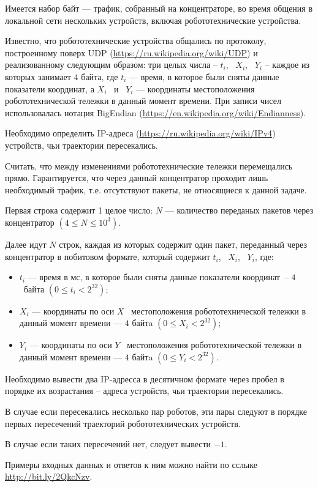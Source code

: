 
Имеется набор байт --- трафик, собранный на концентраторе, во время общения в локальной сети нескольких  устройств,
включая робототехнические устройства.

Известно, что робототехнические устройства общались по протоколу, построенному поверх UDP (\url{https://ru.wikipedia.org/wiki/UDP}) и
реализованному следующим образом: три целых числа -- $t_i$,~ $X_i$, ~$Y_i$ -- каждое из которых занимает $4$ байта,
где $t_i$ --- время, в которое были сняты данные показатели координат, а $X_i$ ~и~ $Y_i$ --- координаты местоположения
робототехнической тележки в данный момент времени.
При записи чисел использовалась нотация BigEndian (\url{https://en.wikipedia.org/wiki/Endianness}).

Необходимо определить IP-адреса (\url{https://ru.wikipedia.org/wiki/IPv4}) \linebreak устройств, чьи траектории пересекались.


Считать, что между изменениями робототехнические тележки перемещались прямо.
Гарантируется, что через данный концентратор проходит лишь необходимый трафик, т.е. отсутствуют пакеты,
не относящиеся к данной задаче.



Первая строка содержит 1 целое число: $N$ --- количество переданых пакетов через концентратор  $(4 \leq N \leq 10^3)$.

Далее идут $N$ строк, каждая из которых содержит один пакет, переданный через концентратор в побитовом формате, который содержит
$t_i$,~ $X_i$, ~$Y_i$, где:
\begin{itemize}
    \item $t_i$ --- время в мс, в которое были сняты данные показатели координат~-- $4$~байта $(0 \leq t_i < 2^{32})$;
    \item $X_i$ --- координаты по оси $X$~ местоположения робототехнической тележки в данный момент времени --- $4$ байтa $(0 \leq X_i < 2^{32})$;
    \item $Y_i$ --- координаты по оси $Y$~ местоположения робототехнической тележки в данный момент времени --- $4$ байтa $(0 \leq Y_i < 2^{32})$.
\end{itemize}

\outputfmtSection

Необходимо вывести два IP-адресса в десятичном формате через пробел в порядке их возрастания -- адреса устройств,
чьи траектории пересекались.

В случае если пересекались несколько пар роботов, эти пары следуют в порядке первых пересечений траекторий
робототехнических устройств.

В случае если таких пересечений нет, следует вывести $-1$.

\exampleSection

Примеры входных данных и ответов к ним можно найти по сслыке \url{http://bit.ly/2QkcNzv}.


